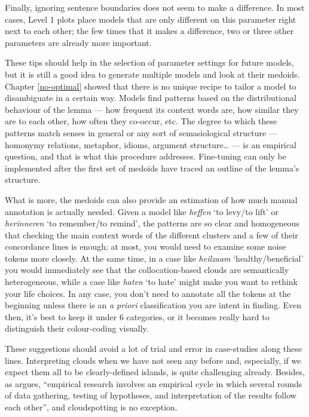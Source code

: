 \documentclass[
]{book}
\begin{document}
Finally, ignoring sentence boundaries does not seem to make a difference. In most cases, Level 1 plots place models that are only different on this parameter right next to each other; the few times that it makes a difference, two or three other parameters are already more important.

These tips should help in the selection of parameter settings for future models, but it is still a good idea to generate multiple models and look at their medoids. Chapter \ref{no-optimal} showed that there is no unique recipe to tailor a model to disambiguate in a certain way. Models find patterns based on the distributional behaviour of the lemma --- how frequent its context words are, how similar they are to each other, how often they co-occur, etc. The degree to which these patterns match senses in general or any sort of semasiological structure --- homonymy relations, metaphor, idioms, argument structure\ldots{} --- is an empirical question, and that is what this procedure addresses. Fine-tuning can only be implemented after the first set of medoids have traced an outline of the lemma's structure.

What is more, the medoids can also provide an estimation of how much manual annotation is actually needed. Given a model like \emph{heffen} `to levy/to lift' or \emph{herinneren} `to remember/to remind', the patterns are so clear and homogeneous that checking the main context words of the different clusters and a few of their concordance lines is enough; at most, you would need to examine some noise tokens more closely. At the same time, in a case like \emph{heilzaam} `healthy/beneficial' you would immediately see that the collocation-based clouds are semantically heterogeneous, while a case like \emph{haten} `to hate' might make you want to rethink your life choices. In any case, you don't need to annotate all the tokens at the beginning unless there is an \emph{a priori} classification you are intent in finding. Even then, it's best to keep it under 6 categories, or it becomes really hard to distinguish their colour-coding visually.

These suggestions should avoid a lot of trial and error in case-studies along these lines. Interpreting clouds when we have not seen any before and, especially, if we expect them all to be clearly-defined islands, is quite challenging already. Besides, as \textcite[73]{geeraerts_2010} argues, ``empirical research involves an empirical cycle in which several rounds of data gathering, testing of hypotheses, and interpretation of the results follow each other'', and cloudspotting is no exception.
\end{document}
